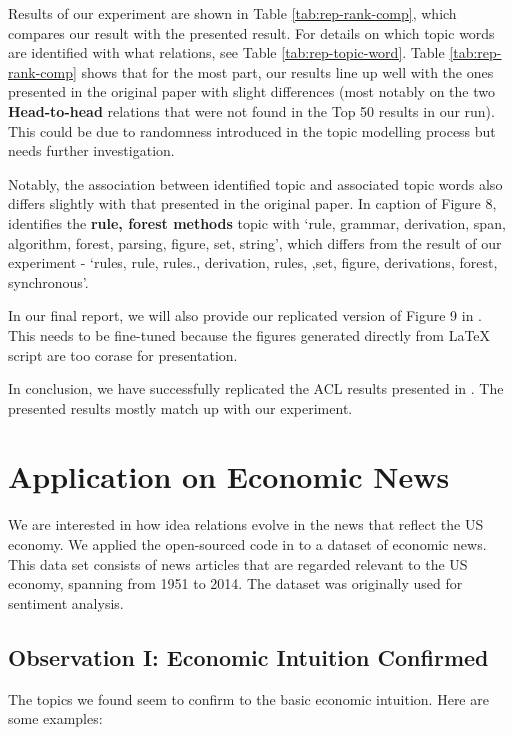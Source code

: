 \documentclass[11pt,a4paper]{article}
\newcommand\boldhead[1]{\textcolor{red-brown}{\textbf{#1}}}
\begin{document}
Results of our experiment are shown in Table \ref{tab:rep-rank-comp}, which compares our result with the presented result. For details on which topic words are identified with what relations, see Table \ref{tab:rep-topic-word}. Table \ref{tab:rep-rank-comp} shows that for the most part, our results line up well with the ones presented in the original paper with slight differences (most notably on the two \boldhead{Head-to-head} relations that were not found in the Top 50 results in our run). This could be due to randomness introduced in the topic modelling process but needs further investigation.

Notably, the association between identified topic and associated topic words also differs slightly with that presented in the original paper. In caption of Figure 8, \citet{chenhao-idea-relations} identifies the \textbf{rule, forest methods} topic with `rule, grammar, derivation, span, algorithm, forest, parsing, figure, set, string', which differs from the result of our experiment - `rules, rule, rules., derivation, rules, ,set, figure, derivations, forest, synchronous'.

In our final report, we will also provide our replicated version of Figure 9 in \citet{chenhao-idea-relations}. This needs to be fine-tuned because the figures generated directly from LaTeX script are too corase for presentation.

In conclusion, we have successfully replicated the ACL results presented in \citet{chenhao-idea-relations}. The presented results mostly match up with our experiment. 


\section{Application on Economic News}
We are interested in how idea relations evolve in the news that reflect the US economy. We applied the open-sourced code in \citet{chenhao-idea-relations} to a dataset of economic news. This data set \cite{econ-news-dataset} consists of news articles that are regarded relevant to the US economy, spanning from 1951 to 2014. The dataset was originally used for sentiment analysis. 

\subsection{Observation I: Economic Intuition Confirmed}
The topics we found seem to confirm to the basic economic intuition. Here are some examples: 
\end{document}
